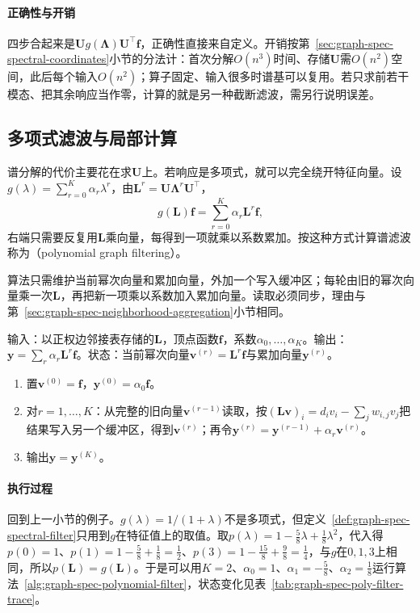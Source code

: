 \paragraph{正确性与开销}
四步合起来是$\bm U g(\bm\Lambda)\bm U^{\top}\bm f$，正确性直接来自定义。开销按第~\ref{sec:graph-spec-spectral-coordinates}小节的分法计：首次分解$O(n^3)$时间、存储$\bm U$需$O(n^2)$空间，此后每个输入$O(n^2)$；算子固定、输入很多时谱基可以复用。若只求前若干模态、把其余响应当作零，计算的就是另一种截断滤波，需另行说明误差。

\subsection{多项式滤波与局部计算}
\label{sec:graph-spec-polynomial-filter}

谱分解的代价主要花在求$\bm U$上。若响应是多项式，就可以完全绕开特征向量。设$g(\lambda)=\sum_{r=0}^K\alpha_r\lambda^r$，由$\bm L^r=\bm U\bm\Lambda^r\bm U^{\top}$，
\begin{equation}
 g(\bm L)\bm f=\sum_{r=0}^K\alpha_r\bm L^r\bm f ,
 \label{eq:graph-spec-polynomial-filter}
\end{equation}
右端只需要反复用$\bm L$乘向量，每得到一项就乘以系数累加。按这种方式计算谱滤波称为（polynomial graph filtering）。

算法只需维护当前幂次向量和累加向量，外加一个写入缓冲区；每轮由旧的幂次向量乘一次$\bm L$，再把新一项乘以系数加入累加向量。读取必须同步，理由与第~\ref{sec:graph-spec-neighborhood-aggregation}小节相同。

\begin{algorithm}[多项式图滤波]
\label{alg:graph-spec-polynomial-filter}
输入：以正权边邻接表存储的$\bm L$，顶点函数$\bm f$，系数$\alpha_0,\ldots,\alpha_K$。输出：$\bm y=\sum_r\alpha_r\bm L^r\bm f$。状态：当前幂次向量$\bm v^{(r)}=\bm L^r\bm f$与累加向量$\bm y^{(r)}$。
\begin{enumerate}
 \item 置$\bm v^{(0)}=\bm f$，$\bm y^{(0)}=\alpha_0\bm f$。
 \item 对$r=1,\ldots,K$：从完整的旧向量$\bm v^{(r-1)}$读取，按$(\bm L\bm v)_i=d_iv_i-\sum_jw_{i,j}v_j$把结果写入另一个缓冲区，得到$\bm v^{(r)}$；再令$\bm y^{(r)}=\bm y^{(r-1)}+\alpha_r\bm v^{(r)}$。
 \item 输出$\bm y=\bm y^{(K)}$。
\end{enumerate}
\end{algorithm}

\paragraph{执行过程}
回到上一小节的例子。$g(\lambda)=1/(1+\lambda)$不是多项式，但定义~\ref{def:graph-spec-spectral-filter}只用到$g$在特征值上的取值。取$p(\lambda)=1-\tfrac58\lambda+\tfrac18\lambda^2$，代入得$p(0)=1$、$p(1)=1-\tfrac58+\tfrac18=\tfrac12$、$p(3)=1-\tfrac{15}8+\tfrac98=\tfrac14$，与$g$在$0,1,3$上相同，所以$p(\bm L)=g(\bm L)$。于是可以用$K=2$、$\alpha_0=1$、$\alpha_1=-\tfrac58$、$\alpha_2=\tfrac18$运行算法~\ref{alg:graph-spec-polynomial-filter}，状态变化见表~\ref{tab:graph-spec-poly-filter-trace}。

